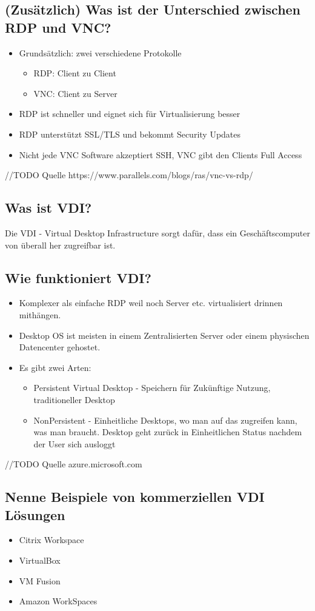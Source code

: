 \subsection*{(Zusätzlich) Was ist der Unterschied zwischen RDP und VNC?}
\begin{itemize}
    \item Grundsätzlich: zwei verschiedene Protokolle
    \begin{itemize}
        \item RDP: \flqq{}Client zu Client\frqq
        \item VNC: \flqq{}Client zu Server\frqq
    \end{itemize}
    \item RDP ist schneller und eignet sich für Virtualisierung besser
    \item RDP unterstützt SSL/TLS und bekommt Security Updates
    \item Nicht jede VNC Software akzeptiert SSH, VNC gibt den Clients \flqq{}Full Access\frqq
\end{itemize}
//TODO Quelle https://www.parallels.com/blogs/ras/vnc-vs-rdp/

\subsection*{Was ist VDI?}
Die VDI - Virtual Desktop Infrastructure sorgt dafür, dass ein Geschäftscomputer von überall her zugreifbar ist.

\subsection*{Wie funktioniert VDI?}
\begin{itemize}
    \item Komplexer als einfache RDP weil noch Server etc. virtualisiert drinnen mithängen.
    \item Desktop OS ist meisten in einem Zentralisierten Server oder einem physischen Datencenter gehostet.
    \item Es gibt zwei Arten:
    \begin{itemize}
        \item Persistent Virtual Desktop - Speichern für Zukünftige Nutzung, traditioneller Desktop
        \item NonPersistent - Einheitliche Desktops, wo man auf das zugreifen kann, was man braucht. Desktop geht zurück in Einheitlichen Status nachdem der User sich ausloggt
    \end{itemize}
\end{itemize}
//TODO Quelle azure.microsoft.com

\subsection*{Nenne Beispiele von kommerziellen VDI Lösungen}
\begin{itemize}
    \item Citrix Workspace
    \item VirtualBox
    \item VM Fusion
    \item Amazon WorkSpaces
\end{itemize}